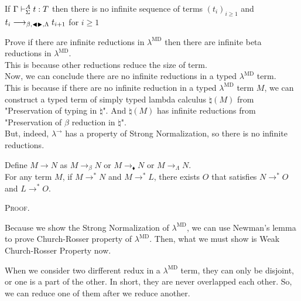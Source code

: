 \begin{theorem}
	If $\Gamma\vdash_\Sigma^A t:T$ then there is no infinite sequence of terms $(t_i)_{i\ge1}$ and $t_i \longrightarrow_{\beta, {\mathop{\blacktriangleleft}} {\mathop{\blacktriangleright}},\Lambda} t_{i+1}$ for $i\ge 1$
\end{theorem}

Prove if there are infinite reductions in $\lambda^{\text{MD}}$ then there are infinite beta reductions in $\lambda^{\text{MD}}$.\\
This is because other reductions reduce the size of term.\\

Now, we can conclude there are no infinite reductions in a typed $\lambda^{\text{MD}}$ term. \\

This is because if there are no infinite reduction in a typed $\lambda^{\text{MD}}$ term $M$,
we can construct a typed term of simply typed lambda calculus $\natural(M)$ from "Preservation of typing in $\natural$".
And $\natural(M)$ has infinite reductions from "Preservation of $\beta$ reduction in $\natural$".\\

But, indeed, $\lambda^\to$ has a property of Strong Normalization, so there is no infinite reductions.

\begin{theorem}
	Define $M \longrightarrow N$ as $M \longrightarrow_{\beta} N$ or $M\longrightarrow_\blacklozenge N$ or  $M \longrightarrow_{\Lambda} N$.\\
	For any term $M$, if $M \longrightarrow^* N$ and $M \longrightarrow^* L$,
	there exists $O$ that satisfies $N \longrightarrow^* O$ and $L \longrightarrow^* O$.
\end{theorem}

\textsc{Proof.}

Because we show the Strong Normalization of $\lambda^{\text{MD}}$, we can use Newman's lemma to prove Church-Rosser property of $\lambda^{\text{MD}}$.
Then, what we must show is Weak Church-Rosser Property now.

When we consider two dirfferent redux in a $\lambda^{\text{MD}}$ term, they can only be disjoint, or one is a part of the other.
In short, they are never overlapped each other.
So, we can reduce one of them after we reduce another.\\


